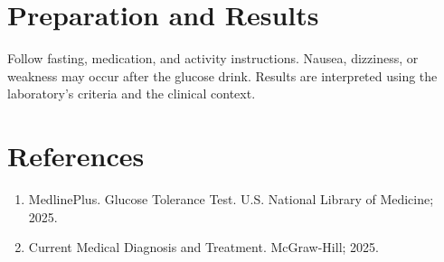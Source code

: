 \section*{Preparation and Results}
Follow fasting, medication, and activity instructions. Nausea, dizziness, or weakness may occur after the glucose drink. Results are interpreted using the laboratory's criteria and the clinical context.

\section*{References}
\begin{enumerate}
  \item MedlinePlus. Glucose Tolerance Test. U.S. National Library of Medicine; 2025.
  \item Current Medical Diagnosis and Treatment. McGraw-Hill; 2025.
\end{enumerate}
\clearpage
